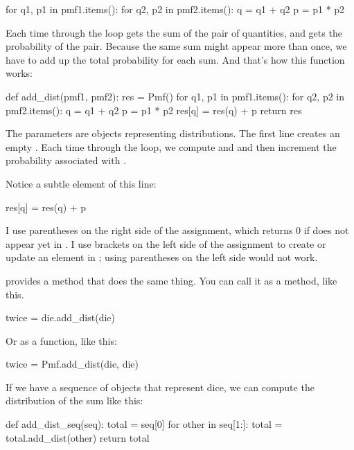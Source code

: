 \documentclass[12pt]{book}
\theoremstyle{exercise}
\begin{document}
\begin{code}
for q1, p1 in pmf1.items():
    for q2, p2 in pmf2.items():
        q = q1 + q2
        p = p1 * p2
\end{code}

Each time through the loop  gets the sum of the pair of quantities, and  gets the probability of the pair.
Because the same sum might appear more than once, we have to add up the total probability for each sum.
And that's how this function works:

\begin{code}
def add_dist(pmf1, pmf2):
    res = Pmf()
    for q1, p1 in pmf1.items():
        for q2, p2 in pmf2.items():
            q = q1 + q2
            p = p1 * p2
            res[q] = res(q) + p
    return res
\end{code}

The parameters are  objects representing distributions.
The first line creates an empty .
Each time through the loop, we compute  and  and then increment the probability associated with .

Notice a subtle element of this line:

\begin{code}
            res[q] = res(q) + p
\end{code}

I use parentheses on the right side of the assignment, which returns 0 if  does not appear yet in .
I use brackets on the left side of the assignment to create or update an element in ; using parentheses on the left side would not work.

 provides a method that does the same thing.
You can call it as a method, like this.

\begin{code}
twice = die.add_dist(die)
\end{code}

Or as a function, like this:

\begin{code}
twice = Pmf.add_dist(die, die)
\end{code}

If we have a sequence of  objects that represent dice, we can compute the distribution of the sum like this:

\begin{code}
def add_dist_seq(seq):
    total = seq[0]
    for other in seq[1:]:
        total = total.add_dist(other)
    return total
\end{code}
\end{document}
